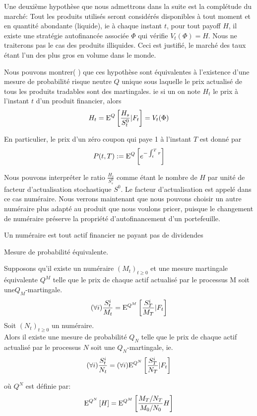Une deuxième hypothèse que nous admettrons dans la suite est la complétude du marché: Tout les produits utilisés seront considérés disponibles à tout moment et en quantité abondante (liquide), ie à chaque instant $t$, pour tout payoff $H$, il existe une stratégie autofinancée associée $\Phi$ qui vérifie $V_t( \Phi ) = H$. Nous ne traiterons pas le cas des produits illiquides. Ceci est justifié, le marché des taux étant l'un des plus gros en volume dans le monde.

Nous pouvons montrer( \cite{Brugo}) que ces hypothèse sont équivalentes à l'existence d'une mesure de probabilité risque neutre $Q$ unique sous laquelle le prix actualisé de tous les produits tradables sont des martingales. ie si un on note $H_t$ le prix à l'instant $t$ d'un produit financier, alors
$$H_t =\mathrm{E}^Q \left[  \frac{H_s}{S^0_t} | F_t  \right] = V_t(\Phi)$$

En particulier, le prix d'un zéro coupon qui paye 1 à l'instant $T$ est donné par
$$ P(t, T) := \mathrm{E}^Q \left[   e^{-\int_t^T r}  \right] $$


Nous pouvons interpréter le ratio $\frac{H_s}{ S^0_s}$ comme étant le nombre  de $H$ par unité de facteur d'actualisation stochastique $S^0$. Le facteur d'actualisation est appelé dans ce cas numéraire. Nous verrons maintenant que nous pouvons choisir un autre numéraire plus adapté au produit que nous voulons pricer, puisque le changement de numéraire préserve la propriété d'autofinancement d'un portefeuille. \cite{Hull}

\begin{defn} Un numéraire est tout actif financier ne payant pas de dividendes \end{defn}

\begin{defn} Mesure de probabilité équivalente.
  
Supposons qu’il existe un numéraire $(M_t )_{t \geq 0}$ et une mesure martingale équivalente $Q^M$ telle que le prix de chaque actif actualisé par le processus M soit une$Q_M$-martingale. 
$$  (\forall i) \frac{S^i_t}{M_t} = \mathrm{E}^{Q^M} \left[  \frac{S^i_T}{M_T} | F_t \right]$$
Soit $(N_t )_{t \geq 0}$ un numéraire. \\
Alors il existe une mesure de probabilité $Q_N$ telle que le prix de chaque actif actualisé par le processus $N$ soit une $Q_N$-martingale, ie.
$$ (\forall i) \frac{S^i_t}{N_t} = (\forall i) \mathrm{E}^{Q^N} \left[  \frac{S^i_T}{N_T} | F_t \right]$$

où $Q^N$ est définie par:
$$\mathrm{E}^{Q^N} \left[  H  \right] = \mathrm{E}^{Q^M} \left[  \frac{ M_T/N_T}{M_0/N_0} H \right]$$

\end{defn}

